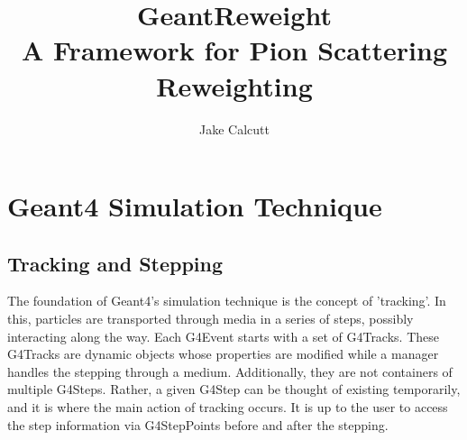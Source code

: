 \documentclass[12pt]{article}
\title{GeantReweight \\ 
   \large A Framework for Pion Scattering Reweighting}
\date{}
\begin{document}
\author[1]{Jake Calcutt}

\maketitle
\thispagestyle{fancy}

\section{Geant4 Simulation Technique}
\subsection{Tracking and Stepping}
The foundation of Geant4's simulation technique is the concept of 'tracking'. In this, particles are transported through media in a series of steps, possibly interacting along the way. Each G4Event starts with a set of G4Tracks. These G4Tracks are dynamic objects whose properties are modified while a manager handles the stepping through a medium. Additionally, they are not containers of multiple G4Steps. Rather, a given G4Step can be thought of existing temporarily, and it is where the main action of tracking occurs. It is up to the user to access the step information via G4StepPoints before and after the stepping. 
\end{document}
